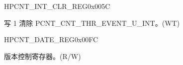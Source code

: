 \begin{register}{H}{PCNT\_INT\_CLR\_REG}{0x005C}\label{regdesc:PCNTINTCLRREG}
%
%
%
%
%
\regnewline%
\begin{regdesc}\begin{reglist}
\label{fielddesc:PCNTCNTTHREVENTUNINTCLR}\item [PCNT\_CNT\_THR\_EVENT\_U\regindex{n}\_INT\_CLR (\regindex{n}: 0-3)] 写 1 清除 PCNT\_CNT\_THR\_EVENT\_U\_INT。(WT)
\end{reglist}\end{regdesc}
\end{register}


\begin{register}{H}{PCNT\_DATE\_REG}{0x00FC}\label{regdesc:PCNTDATEREG}
%
\regnewline%
\begin{regdesc}\begin{reglist}
\label{fielddesc:PCNTDATE}\item [PCNT\_DATE] 版本控制寄存器。(R/W)
\end{reglist}\end{regdesc}
\end{register}
